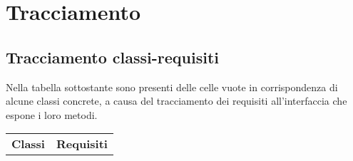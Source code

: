 \newdimen\larghezza

\section{Tracciamento}
\label{tracciamento}

\subsection{Tracciamento classi-requisiti}
\label{tracciamentoclassirequisiti}

Nella tabella sottostante sono presenti delle celle vuote in corrispondenza di alcune classi concrete, a causa del tracciamento dei requisiti all'interfaccia che espone i loro metodi.


\begin{center}
\begin{longtable}{|c|l|}
\hline

\textbf{Classi} & \textbf{Requisiti} \\


\end{longtable}
\end{center}
